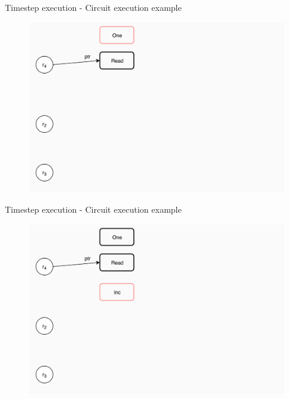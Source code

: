 \documentclass[xcolor={usenames}]{beamer}
\begin{document}
  \begin{frame}{Timestep execution - Circuit execution example}
  	\begin{figure}
  		\centering
  		\includegraphics[width=\textwidth]{../figures/example-circuit-3.png}
  	\end{figure}
  \end{frame}
  \begin{frame}{Timestep execution - Circuit execution example}
  	\begin{figure}
  		\centering
  		\includegraphics[width=\textwidth]{../figures/example-circuit-4.png}
  	\end{figure}
  \end{frame}
\end{document}
